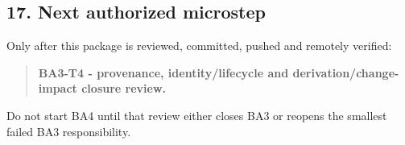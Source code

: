 \documentclass[11pt,a4paper]{article}
\begin{document}
\subsection{17. Next authorized
microstep}\label{next-authorized-microstep}

Only after this package is reviewed, committed, pushed and remotely
verified:

\begin{quote}
\textbf{BA3-T4 - provenance, identity/lifecycle and
derivation/change-impact closure review.}
\end{quote}

Do not start BA4 until that review either closes BA3 or reopens the
smallest failed BA3 responsibility.
\end{document}
